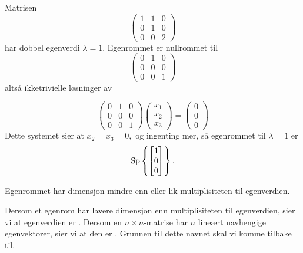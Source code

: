 \begin{ex}
Matrisen
\[
\begin{pmatrix}
1 & 1 & 0\\  0 &1 & 0 \\ 0 & 0 & 2
\end{pmatrix}
\]
har dobbel egenverdi $\lambda=1$. Egenrommet er nullrommet til 
\[
\begin{pmatrix}
0 & 1 & 0\\  0 &0 & 0 \\ 0 & 0 & 1
\end{pmatrix}
\]
altså ikketrivielle løsninger av 

\[
\begin{pmatrix}
0 & 1 & 0\\  0 &0 & 0 \\ 0 & 0 & 1
\end{pmatrix}
\begin{pmatrix}
x_1  \\ x_2 \\ x_3
\end{pmatrix}
=
\begin{pmatrix}
0  \\ 0 \\0
\end{pmatrix}
\]
Dette systemet sier at
$
x_2=x_3=0,
$
og ingenting mer, så egenrommet til $\lambda=1$ er
\[
\operatorname{Sp} \left\{ \begin{bmatrix} 1 \\ 0 \\ 0 \end{bmatrix} \right\}.
\]
\end{ex}


\begin{thm}
Egenrommet har dimensjon mindre enn eller lik multiplisiteten til egenverdien. 
\end{thm}

Dersom et egenrom har lavere dimensjon enn multiplisiteten til egenverdien, sier vi at egenverdien er . 
Dersom en $n\times n$-matrise har $n$ lineært uavhengige egenvektorer, sier vi at den er .
Grunnen til dette navnet skal vi komme tilbake til.





\kapittelslutt
